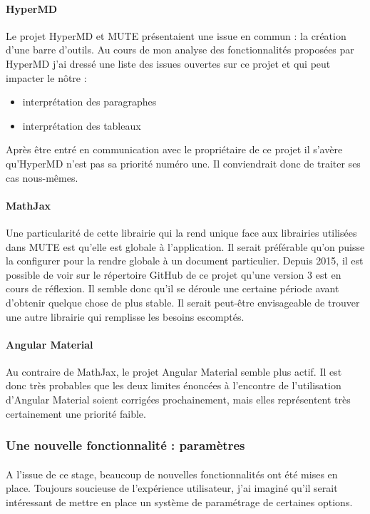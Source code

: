 \documentclass[12pt]{article}
\begin{document}
\paragraph{HyperMD}
Le projet HyperMD et MUTE présentaient une issue en commun : la création d'une barre d'outils. Au cours de mon analyse des fonctionnalités proposées par HyperMD j'ai dressé une liste des issues ouvertes sur ce projet et qui peut impacter le nôtre :
\begin{itemize}
    \item interprétation des paragraphes
    \item interprétation des tableaux
\end{itemize}
Après être entré en communication avec le propriétaire de ce projet il s'avère qu'HyperMD n'est pas sa priorité numéro une. Il conviendrait donc de traiter ses cas nous-mêmes.

\paragraph{MathJax}
Une particularité de cette librairie qui la rend unique face aux librairies utilisées dans MUTE est qu'elle est globale à l'application. Il serait préférable qu'on puisse la configurer pour la rendre globale à un document particulier. Depuis 2015, il est possible de voir sur le répertoire GitHub de ce projet qu'une version 3 est en cours de réflexion. Il semble donc qu'il se déroule une certaine période avant d'obtenir quelque chose de plus stable. Il serait peut-être envisageable de trouver une autre librairie qui remplisse les besoins escomptés.

\paragraph{Angular Material}
Au contraire de MathJax, le projet Angular Material semble plus actif. Il est donc très probables que les deux limites énoncées à l'encontre de l'utilisation d'Angular Material soient corrigées prochainement, mais elles représentent très certainement une priorité faible.

\subsubsection{Une nouvelle fonctionnalité : paramètres}
\paragraph{}
A l'issue de ce stage, beaucoup de nouvelles fonctionnalités ont été mises en place. Toujours soucieuse de l'expérience utilisateur, j'ai imaginé qu'il serait intéressant de mettre en place un système de paramétrage de certaines options.
\end{document}
